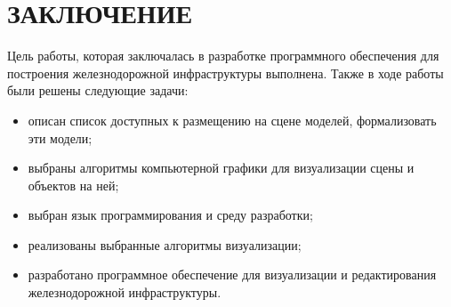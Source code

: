 \begingroup
\titleformat{\chapter}[display]
  {\normalfont\bfseries\centering}{\chaptertitlename\ \thechapter}{18pt}{\centering}

\chapter*{ЗАКЛЮЧЕНИЕ}

\endgroup
{}

Цель работы, которая заключалась в разработке программного обеспечения для построения
железнодорожной инфраструктуры выполнена. Также в ходе работы были решены следующие задачи:
\begin{itemize}
    \item описан список доступных к размещению на сцене моделей, формализовать эти модели;
    \item выбраны алгоритмы компьютерной графики для визуализации сцены и
    объектов на ней;
    \item выбран язык программирования и среду разработки;
    \item реализованы выбранные алгоритмы визуализации;
    \item разработано программное обеспечение для визуализации и редактирования
    железнодорожной инфраструктуры.
\end{itemize}
